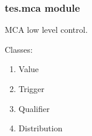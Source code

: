 \documentclass[letterpaper,10pt,english]{sphinxmanual}
\begin{document}
\subsubsection{tes.mca module}
\label{\detokenize{tes:module-tes.mca}}\label{\detokenize{tes:tes-mca-module}}
\sphinxAtStartPar
MCA low level control.

\sphinxAtStartPar
Classes:
\begin{enumerate}
%
\item {} 
\sphinxAtStartPar
Value

\item {} 
\sphinxAtStartPar
Trigger

\item {} 
\sphinxAtStartPar
Qualifier

\item {} 
\sphinxAtStartPar
Distribution

\end{enumerate}
\end{document}
